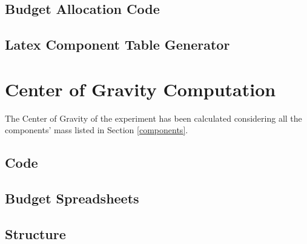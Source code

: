 \documentclass[a4paper,12pt,twoside]{article}
\begin{document}
\begin{appendices}
\subsection{Budget Allocation Code}



\newpage
\subsection{Latex Component Table Generator}



\newpage


\newpage
\section{Center of Gravity Computation}



The Center of Gravity of the experiment has been calculated considering all the components' mass listed in Section \ref{components}.


\subsection{Code}










\newpage

\begin{landscape}
\section{Budget Spreadsheets}
\label{sec:appO}

\subsection{Structure}


\end{landscape}
\end{appendices}
\end{document}
